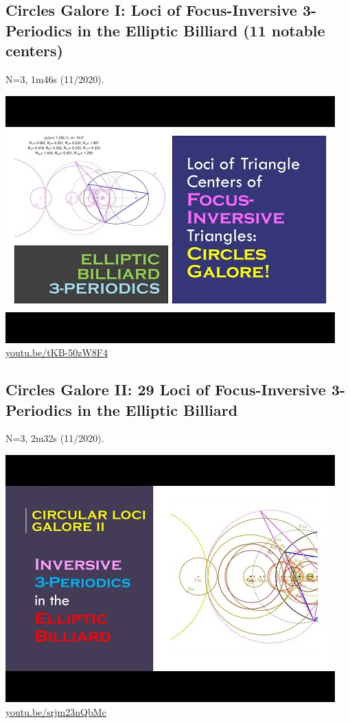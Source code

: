 \documentclass[12pt]{amsart}
\begin{document}
\subsection{Circles Galore I: Loci of Focus-Inversive 3-Periodics in the Elliptic Billiard (11 notable centers)}
\label{vid:tKB-50zW8F4}
\noindent N=3, 1m46s (11/2020). 
\begin{center}\includegraphics[width=.5\textwidth]{pics/tKB-50zW8F4.jpg} \\ 
\href{https://youtu.be/tKB-50zW8F4}{\url{youtu.be/tKB-50zW8F4}}\end{center}
% 

\subsection{Circles Galore II: 29 Loci of Focus-Inversive 3-Periodics in the Elliptic Billiard}
\label{vid:srjm23nQbMc}
\noindent N=3, 2m32s (11/2020). 
\begin{center}\includegraphics[width=.5\textwidth]{pics/srjm23nQbMc.jpg} \\ 
\href{https://youtu.be/srjm23nQbMc}{\url{youtu.be/srjm23nQbMc}}\end{center}
% 
\end{document}

